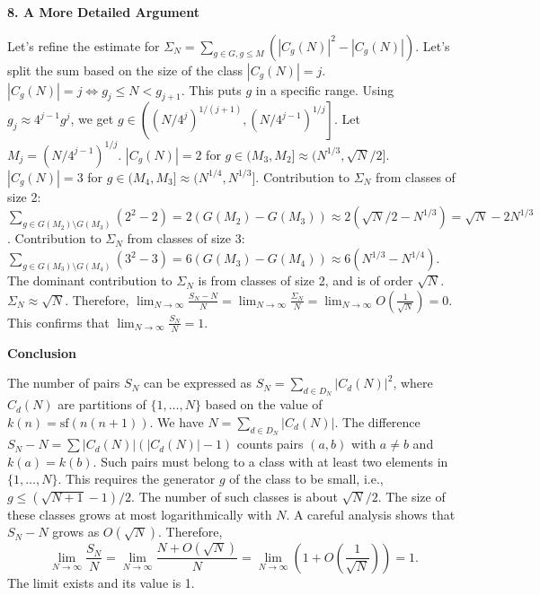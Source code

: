 \documentclass[12pt,a4paper]{article}
\theoremstyle{definition}
\begin{document}
    \textbf{8. A More Detailed Argument}

    Let's refine the estimate for $\Sigma_N = \sum_{g \in G, g \le M} (|C_g(N)|^2 - |C_g(N)|)$.
    Let's split the sum based on the size of the class $|C_g(N)|=j$.
    $|C_g(N)| = j \iff g_j \le N < g_{j+1}$. This puts $g$ in a specific range.
    Using $g_j \approx 4^{j-1}g^j$, we get $g \in \left( (N/4^j)^{1/(j+1)}, (N/4^{j-1})^{1/j} \right]$.
    Let $M_j = (N/4^{j-1})^{1/j}$.
    $|C_g(N)| = 2$ for $g \in (M_3, M_2] \approx (N^{1/3}, \sqrt{N}/2]$.
    $|C_g(N)| = 3$ for $g \in (M_4, M_3] \approx (N^{1/4}, N^{1/3}]$.
    Contribution to $\Sigma_N$ from classes of size 2:
    $\sum_{g \in G(M_2)\setminus G(M_3)} (2^2-2) = 2(G(M_2)-G(M_3)) \approx 2(\sqrt{N}/2 - N^{1/3}) = \sqrt{N} - 2N^{1/3}$.
    Contribution to $\Sigma_N$ from classes of size 3:
    $\sum_{g \in G(M_3)\setminus G(M_4)} (3^2-3) = 6(G(M_3)-G(M_4)) \approx 6(N^{1/3} - N^{1/4})$.
    The dominant contribution to $\Sigma_N$ is from classes of size 2, and is of order $\sqrt{N}$.
    $\Sigma_N \approx \sqrt{N}$.
    Therefore, $\lim_{N\to\infty} \frac{S_N-N}{N} = \lim_{N\to\infty} \frac{\Sigma_N}{N} = \lim_{N\to\infty} O\left(\frac{1}{\sqrt{N}}\right) = 0$.
    This confirms that $\lim_{N\to\infty} \frac{S_N}{N} = 1$.

    \textbf{Conclusion}

    The number of pairs $S_N$ can be expressed as $S_N = \sum_{d \in D_N} |C_d(N)|^2$, where $C_d(N)$ are partitions of $\{1, \ldots, N\}$ based on the value of $k(n)=\text{sf}(n(n+1))$. We have $N = \sum_{d \in D_N} |C_d(N)|$.
    The difference $S_N - N = \sum |C_d(N)|(|C_d(N)|-1)$ counts pairs $(a,b)$ with $a \ne b$ and $k(a)=k(b)$.
    Such pairs must belong to a class with at least two elements in $\{1, \ldots, N\}$. This requires the generator $g$ of the class to be small, i.e., $g \le (\sqrt{N+1}-1)/2$.
    The number of such classes is about $\sqrt{N}/2$. The size of these classes grows at most logarithmically with $N$. A careful analysis shows that $S_N-N$ grows as $O(\sqrt{N})$.
    Therefore,
    \[ \lim_{N\to\infty}\frac{S_N}{N} = \lim_{N\to\infty}\frac{N + O(\sqrt{N})}{N} = \lim_{N\to\infty}\left(1 + O\left(\frac{1}{\sqrt{N}}\right)\right) = 1. \]
    The limit exists and its value is 1.
\end{document}
